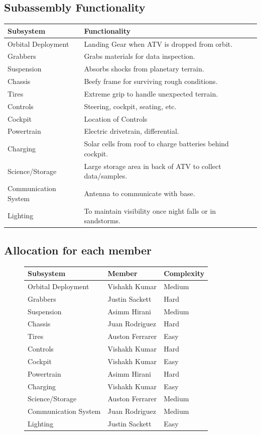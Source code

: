 \subsection{Subassembly Functionality}
\begin{center}
\begin{tabular}{lll}
\hline
Subsystem & Functionality\\
\hline
Orbital Deployment & Landing Gear when ATV is dropped from orbit. \\
Grabbers & Grabs materials for data inspection.\\
Suspension & Absorbs shocks from planetary terrain. \\
Chassis & Beefy frame for surviving rough conditions.\\
Tires & Extreme grip to handle unexpected terrain. \\
Controls & Steering, cockpit, seating, etc.\\
Cockpit & Location of Controls\\
Powertrain & Electric drivetrain, differential. \\
Charging & Solar cells from roof to charge batteries behind cockpit. \\
Science/Storage & Large storage area in back of ATV to collect data/samples. \\
Communication System & Antenna to communicate with base. \\
Lighting & To maintain visibility once night falls or in sandstorms.\\
\hline
\end{tabular}
\end{center}

\subsection{Allocation for each member}
\label{tab:allocation}
\begin{figure}[!ht]
\centering
\begin{tabular}{lll}
\hline
Subsystem & Member& Complexity\\
\hline
Orbital Deployment & Vishakh Kumar& Medium\\
Grabbers & Justin Sackett & Hard\\
Suspension & Asimm Hirani & Medium\\
Chassis & Juan Rodriguez & Hard\\
Tires & Auston Ferrarer& Easy\\
Controls & Vishakh Kumar & Hard\\
Cockpit & Vishakh Kumar & Easy\\
Powertrain & Asimm Hirani & Hard\\
Charging & Vishakh Kumar & Easy \\
Science/Storage & Auston Ferrarer & Medium\\
Communication System & Juan Rodriguez & Medium\\
Lighting & Justin Sackett& Easy\\
\hline
\end{tabular}
\end{figure}

